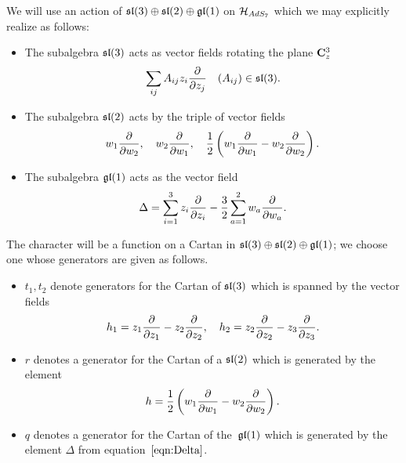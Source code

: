 \documentclass[../main.tex]{subfiles}
\begin{document}
We will use an action of $\mathfrak{sl}(3)\oplus \mathfrak{sl}(2)\oplus \mathfrak{gl}(1)$ on $\mathcal{H}_{AdS_7}$ which we may explicitly realize as follows:
\begin{itemize}\label{eqn:im5}
\item
The subalgebra $\mathfrak{sl}(3)$ acts as vector fields rotating the plane $\mathbf{C}^3_z$
\begin{equation}
\sum_{ij} A_{ij} z_i \frac{\partial}{\partial z_j} \quad (A_{ij}) \in \mathfrak{sl}(3) .
\end{equation}
\item 
The subalgebra $\mathfrak{sl}(2)$ acts by the triple of vector fields
\begin{equation}
 w_1 \frac{\partial}{\partial w_2}, \quad w_2 \frac{\partial}{\partial w_1}, \quad \frac{1}{2}\left (w_1\frac{\partial}{\partial w_1}-w_2\frac{\partial}{\partial w_2}\right).
\end{equation}
\item The subalgebra $\mathfrak{gl}(1)$ acts as the vector field
\begin{equation}\label{eqn:Delta}
        \Delta = \sum_{i=1}^3 z_i\frac{\partial}{\partial z_i} - \frac 32\sum_{a=1}^2 w_a\frac{\partial}{\partial w_a}.
\end{equation}
\end{itemize}


The character will be a function on a Cartan in $\mathfrak{sl}(3)\oplus \mathfrak{sl}(2)\oplus \mathfrak{gl}(1)$; we choose one whose generators are given as follows. 
\begin{itemize}
  \item $t_{1}, t_{2}$ denote generators for the Cartan of $\mathfrak{sl}(3)$ which is spanned by the vector fields
  \begin{equation}
  h_1 = z_1 \frac{\partial}{\partial {z_1}} - z_2 \frac{\partial}{\partial{z_2}} , \quad h_2 = z_2 \frac{\partial}{\partial{z_2}} - z_3 \frac{\partial}{\partial{z_3}}.
  \end{equation}
  \item $r$ denotes a generator for the Cartan of a $\mathfrak{sl}(2)$ which is generated by the element 
  \begin{equation}
  \label{eqn:hCartan}
  h = \frac12 \left(w_1 \frac{\partial}{\partial w_1} - w_2 \frac{\partial}{\partial w_2}\right) .
  \end{equation}
\item $q$ denotes a generator for the Cartan of the~$\mathfrak{gl}(1)$ which is generated by the element $\Delta$ from equation~$\eqref{eqn:Delta}$. 
\end{itemize}
\end{document}
